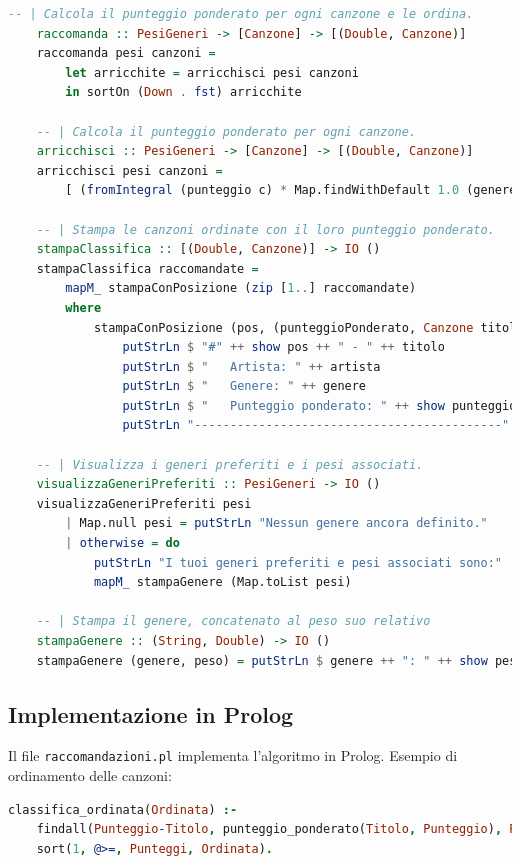 \documentclass[a4paper,11pt]{article}
\begin{document}
\begin{lstlisting}[language=Haskell,caption=raccomandazioni.hs]
    -- | Calcola il punteggio ponderato per ogni canzone e le ordina.
    raccomanda :: PesiGeneri -> [Canzone] -> [(Double, Canzone)]
    raccomanda pesi canzoni =
        let arricchite = arricchisci pesi canzoni
        in sortOn (Down . fst) arricchite
    
    -- | Calcola il punteggio ponderato per ogni canzone.
    arricchisci :: PesiGeneri -> [Canzone] -> [(Double, Canzone)]
    arricchisci pesi canzoni =
        [ (fromIntegral (punteggio c) * Map.findWithDefault 1.0 (genere c) pesi, c) | c <- canzoni ]
    
    -- | Stampa le canzoni ordinate con il loro punteggio ponderato.
    stampaClassifica :: [(Double, Canzone)] -> IO ()
    stampaClassifica raccomandate =
        mapM_ stampaConPosizione (zip [1..] raccomandate)
        where
            stampaConPosizione (pos, (punteggioPonderato, Canzone titolo artista genere _)) = do
                putStrLn $ "#" ++ show pos ++ " - " ++ titolo
                putStrLn $ "   Artista: " ++ artista
                putStrLn $ "   Genere: " ++ genere
                putStrLn $ "   Punteggio ponderato: " ++ show punteggioPonderato
                putStrLn "-------------------------------------------"
    
    -- | Visualizza i generi preferiti e i pesi associati.
    visualizzaGeneriPreferiti :: PesiGeneri -> IO ()
    visualizzaGeneriPreferiti pesi
        | Map.null pesi = putStrLn "Nessun genere ancora definito."
        | otherwise = do
            putStrLn "I tuoi generi preferiti e pesi associati sono:"
            mapM_ stampaGenere (Map.toList pesi)
    
    -- | Stampa il genere, concatenato al peso suo relativo
    stampaGenere :: (String, Double) -> IO ()
    stampaGenere (genere, peso) = putStrLn $ genere ++ ": " ++ show peso
\end{lstlisting}

\subsection{Implementazione in Prolog}
Il file \texttt{raccomandazioni.pl} implementa l'algoritmo in Prolog. Esempio di ordinamento delle canzoni:
\begin{lstlisting}[language=Prolog,caption=raccomandazioni.pl]
classifica_ordinata(Ordinata) :-
    findall(Punteggio-Titolo, punteggio_ponderato(Titolo, Punteggio), Punteggi),
    sort(1, @>=, Punteggi, Ordinata).
\end{lstlisting}
\end{document}
